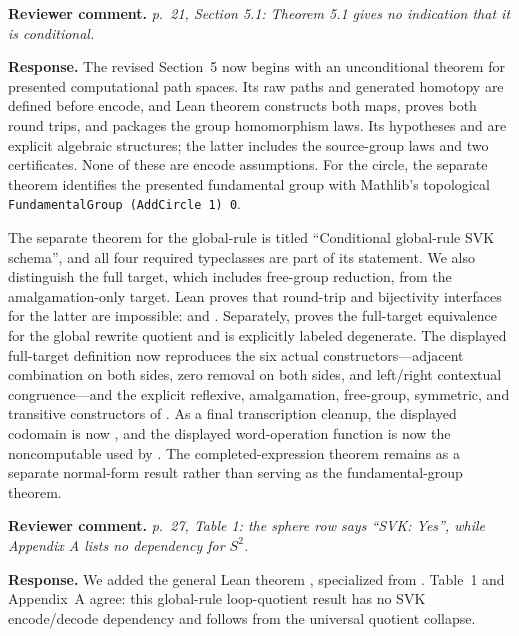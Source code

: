 \documentclass[11pt]{article}
\newcommand{\review}[1]{\par\medskip\noindent
  \textbf{\color{blue!55!black}Reviewer comment.} \emph{#1}\par}
\newcommand{\response}{\par\smallskip\noindent
  \textbf{\color{green!35!black}Response.} }
\begin{document}
\review{p.~21, Section 5.1: Theorem 5.1 gives no indication that it is
conditional.}
\response
The revised Section~5 now begins with an unconditional theorem for presented
computational path spaces.  Its raw paths and generated homotopy are defined
before encode, and Lean theorem
 constructs both maps, proves both
round trips, and packages the group homomorphism laws.  Its hypotheses
 and  are explicit algebraic structures;
the latter includes the source-group laws and two
 certificates.  None of these are encode assumptions.
For the circle, the separate theorem
 identifies the presented
fundamental group with Mathlib's topological
\texttt{FundamentalGroup (AddCircle 1) 0}.

The separate theorem for the global-rule  is titled
``Conditional global-rule SVK schema'', and all four required typeclasses are
part of its statement.  We also distinguish the full target, which includes
free-group reduction, from the amalgamation-only target.  Lean proves that
round-trip and bijectivity interfaces for the latter are impossible:
 and
.  Separately,
 proves the full-target equivalence
for the global rewrite quotient and is explicitly labeled degenerate.
The displayed full-target definition now reproduces the six actual
 constructors---adjacent combination on both sides, zero
removal on both sides, and left/right contextual congruence---and the explicit
reflexive, amalgamation, free-group, symmetric, and transitive constructors of
.
As a final transcription cleanup, the displayed  codomain is now
, and the displayed word-operation function is now the
noncomputable  used by .
The completed-expression theorem  remains as
a separate normal-form result rather than serving as the fundamental-group
theorem.

\review{p.~27, Table 1: the sphere row says ``SVK: Yes'', while Appendix A
lists no dependency for \(S^2\).}
\response
We added the general Lean theorem
, specialized from
.  Table~1 and Appendix~A agree: this global-rule
loop-quotient result has no SVK encode/decode dependency and follows from the
universal quotient collapse.
\end{document}

